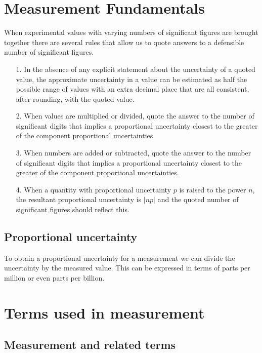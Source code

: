 \section{Measurement Fundamentals}

When experimental values with varying numbers of significant figures are brought together there are several rules that allow us to quote answers to a defensible number of significant figures.

\begin{itemize}
    \item[1.] In the absence of any explicit statement about the uncertainty of a quoted value, the approximate uncertainty in a value can be estimated as half the possible range of values with an extra decimal place that are all consistent, after rounding, with the quoted value.
    \item[2.] When values are multiplied or divided, quote the answer to the number of significant digits that implies a proportional uncertainty closest to the greater of the component proportional uncertainties
    \item[3.] When numbers are added or subtracted, quote the answer to the number of significant digits that implies a proportional uncertainty closest to the greater of the component proportional uncertainties.
    \item[4.] When a quantity with proportional uncertainty $p$ is raised to the power $n$, the resultant proportional uncertainty is $|np|$ and the quoted number of significant figures should reflect this.
\end{itemize}



\subsection{Proportional uncertainty}

To obtain a proportional uncertainty for a measurement we can divide the uncertainty by the measured value. This can be expressed in terms of parts per million or even parts per billion.


\section{Terms used in measurement}

\subsection{Measurement and related terms}

